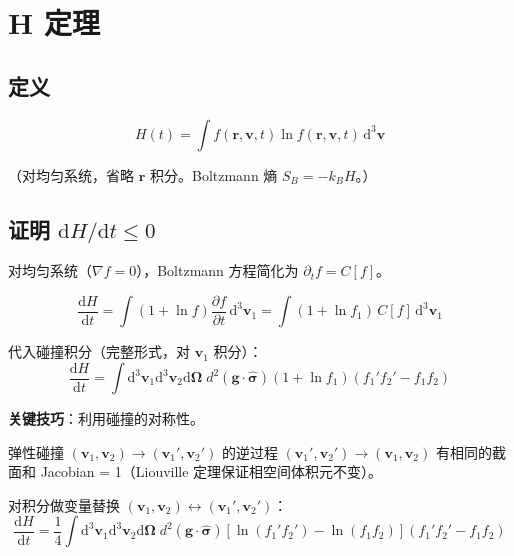\documentclass[11pt,a4paper]{article}
\newcommand{\ri}{\mathbf{r}}
\newcommand{\vi}{\mathbf{v}}
\newcommand{\Om}{\boldsymbol{\Omega}}
\begin{document}
\section{H 定理}

\subsection{定义}

\begin{equation}
H(t) = \int f(\ri,\vi,t)\ln f(\ri,\vi,t)\,\mathrm{d}^3\vi
\end{equation}

（对均匀系统，省略 $\ri$ 积分。Boltzmann 熵 $S_B = -k_B H$。）

\subsection{证明 $\mathrm{d} H/\mathrm{d} t \le 0$}

对均匀系统（$\nabla f = 0$），Boltzmann 方程简化为 $\partial_t f = C[f]$。

\begin{equation}
\frac{\mathrm{d} H}{\mathrm{d} t} = \int (1+\ln f)\frac{\partial f}{\partial t}\,\mathrm{d}^3\vi_1 = \int (1+\ln f_1)\,C[f]\,\mathrm{d}^3\vi_1
\end{equation}

代入碰撞积分（完整形式，对 $\vi_1$ 积分）：
\begin{equation}
\frac{\mathrm{d} H}{\mathrm{d} t} = \int\mathrm{d}^3\vi_1\mathrm{d}^3\vi_2\mathrm{d}\Om\; d^2(\mathbf{g}\cdot\hat{\boldsymbol{\sigma}})(1+\ln f_1)(f_1'f_2' - f_1 f_2)
\end{equation}

\textbf{关键技巧}：利用碰撞的对称性。

弹性碰撞 $(\vi_1,\vi_2)\to(\vi_1',\vi_2')$ 的逆过程 $(\vi_1',\vi_2')\to(\vi_1,\vi_2)$ 有相同的截面和 Jacobian = 1（Liouville 定理保证相空间体积元不变）。

对积分做变量替换 $(\vi_1,\vi_2)\leftrightarrow(\vi_1',\vi_2')$：
\begin{equation}
\frac{\mathrm{d} H}{\mathrm{d} t} = \frac{1}{4}\int\mathrm{d}^3\vi_1\mathrm{d}^3\vi_2\mathrm{d}\Om\; d^2(\mathbf{g}\cdot\hat{\boldsymbol{\sigma}})\left[\ln(f_1'f_2') - \ln(f_1 f_2)\right](f_1'f_2' - f_1 f_2)
\end{equation}
\end{document}
